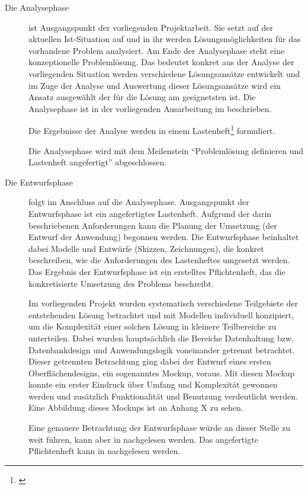 \begin{description}

  \item[Die Analysephase] ist Ausgangspunkt der vorliegenden Projektarbeit. Sie setzt
  auf der aktuellen Ist-Situation auf und in ihr werden Lösungsmöglichkeiten für
  das vorhandene Problem analysiert. Am Ende der Analysephase steht eine
  konzeptionelle Problemlösung. Das bedeutet konkret aus der Analyse der
  vorliegenden Situation werden verschiedene Lösungsansätze entwickelt und im
  Zuge der Analyse und Auswertung dieser Lösungsansätze wird ein Ansatz
  ausgewählt der für die Lösung am geeignetsten ist. Die Analysephase ist in der vorliegenden Ausarbeitung
  im  beschrieben.

  Die Ergebnisse der Analyse werden in einem Lastenheft\footnote{\citet{lastenheft2013}} formuliert.

  Die Analysephase wird mit dem Meilenstein "`Problemlösung definieren und
  Lastenheft angefertigt"' abgeschlossen.


  \item[Die Entwurfsphase] folgt im Anschluss auf die Analysephase.
  Ausgangspunkt der Entwurfsphase ist ein angefertigtes Lastenheft. Aufgrund der
  darin beschriebenen Anforderungen kann die Planung der Umsetzung (der Entwurf
  der Anwendung) begonnen werden. Die Entwurfsphase beinhaltet dabei Modelle und
  Entwürfe (Skizzen, Zeichnungen), die konkret beschreiben, wie die Anforderungen
  des Lastenheftes umgesetzt werden. Das Ergebnis der Entwurfsphase ist ein
  erstelltes Pflichtenheft, das die konkretisierte Umsetzung des Problems
  beschreibt.

  Im vorliegenden Projekt wurden systematisch verschiedene Teilgebiete der
  entstehenden Lösung betrachtet und mit Modellen individuell konzipiert, um die
  Komplexität einer solchen Lösung in kleinere Teilbereiche zu unterteilen. Dabei
  wurden hauptsächlich die Bereiche Datenhaltung bzw. Datenbankdesign und
  Anwendungslogik voneinander getrennt betrachtet. Dieser getrennten Betrachtung
  ging dabei der Entwurf eines ersten Oberflächendesigns, ein sogenanntes
  Mockup, voraus. Mit diesen Mockup konnte ein erster Eindruck über Umfang und
  Komplexität gewonnen werden und zusätzlich Funktionalität und Benutzung
  verdeutlicht werden. Eine Abbildung dieses Mockups ist an Anhang X zu sehen.

  Eine genauere Betrachtung der Entwurfsphase würde an dieser Stelle zu weit führen,
  kann aber in \citet{modelierungUndBetrieb2014} nachgelesen werden.
  Das angefertigte Pflichtenheft kann in \citet{pflichtenheft2013} nachgelesen werden.


\end{description}
